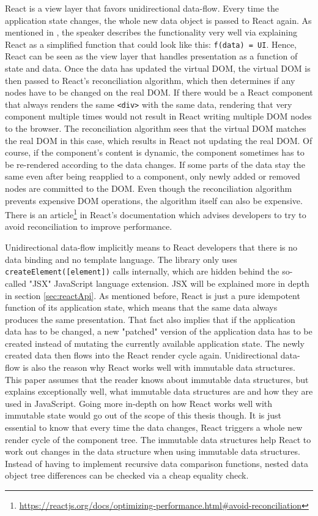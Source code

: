 React is a view layer that favors unidirectional data-flow. Every time the application state changes, the whole new data object is passed to React again. As mentioned in \cite[6:50]{ReactFoundingVideo}, the speaker describes the functionality very well via explaining React as a simplified function that could look like this: \texttt{f(data) = UI}. Hence, React can be seen as the view layer that handles presentation as a function of state and data. Once the data has updated the virtual DOM, the virtual DOM is then passed to React's reconciliation algorithm, which then determines if any nodes have to be changed on the real DOM. If there would be a React component that always renders the same \texttt{<div>} with the same data, rendering that very component multiple times would not result in React writing multiple DOM nodes to the browser. The reconciliation algorithm sees that the virtual DOM matches the real DOM in this case, which results in React not updating the real DOM. Of course, if the component's content is dynamic, the component sometimes has to be re-rendered according to the data changes. If some parts of the data stay the same even after being reapplied to a component, only newly added or removed nodes are committed to the DOM. Even though the reconciliation algorithm prevents expensive DOM operations, the algorithm itself can also be expensive. There is an article\footnote{\url{https://reactjs.org/docs/optimizing-performance.html\#avoid-reconciliation}} in React's documentation which advises developers to try to avoid reconciliation to improve performance.

Unidirectional data-flow implicitly means to React developers that there is no data binding and no template language. The library only uses \texttt{createElement([element])} calls internally, which are hidden behind the so-called "JSX" JavaScript language extension. JSX will be explained more in depth in section \ref{sec:reactApi}. As mentioned before, React is just a pure idempotent function of its application state, which means that the same data always produces the same presentation. That fact also implies that if the application data has to be changed, a new "patched" version of the application data has to be created instead of mutating the currently available application state. The newly created data then flows into the React render cycle again. Unidirectional data-flow is also the reason why React works well with immutable data structures. This paper assumes that the reader knows about immutable data structures, but \cite{ImmutableJS} explains exceptionally well, what immutable data structures are and how they are used in JavaScript. Going more in-depth on how React works well with immutable state would go out of the scope of this thesis though. It is just essential to know that every time the data changes,  React triggers a whole new render cycle of the component tree. The immutable data structures help React to work out changes in the data structure when using immutable data structures. Instead of having to implement recursive data comparison functions, nested data object tree differences can be checked via a cheap equality check.


